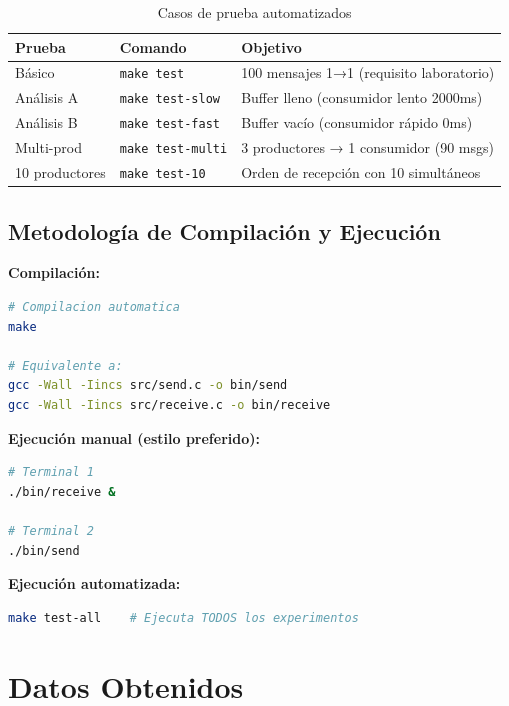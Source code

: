 \documentclass[10pt]{article}
\begin{document}
\begin{table}[h]
\centering
\begin{tabular}{|l|l|p{6cm}|}
\hline
\textbf{Prueba} & \textbf{Comando} & \textbf{Objetivo} \\
\hline
Básico & \texttt{make test} & 100 mensajes 1→1 (requisito laboratorio) \\
\hline
Análisis A & \texttt{make test-slow} & Buffer lleno (consumidor lento 2000ms) \\
\hline
Análisis B & \texttt{make test-fast} & Buffer vacío (consumidor rápido 0ms) \\
\hline
Multi-prod & \texttt{make test-multi} & 3 productores → 1 consumidor (90 msgs) \\
\hline
10 productores & \texttt{make test-10} & Orden de recepción con 10 simultáneos \\
\hline
\end{tabular}
\caption{Casos de prueba automatizados}
\end{table}

\subsection{Metodología de Compilación y Ejecución}

\textbf{Compilación:}
\begin{lstlisting}[language=bash]
# Compilacion automatica
make

# Equivalente a:
gcc -Wall -Iincs src/send.c -o bin/send
gcc -Wall -Iincs src/receive.c -o bin/receive
\end{lstlisting}

\textbf{Ejecución manual (estilo preferido):}
\begin{lstlisting}[language=bash]
# Terminal 1
./bin/receive &

# Terminal 2
./bin/send
\end{lstlisting}

\textbf{Ejecución automatizada:}
\begin{lstlisting}[language=bash]
make test-all    # Ejecuta TODOS los experimentos
\end{lstlisting}

\clearpage

\section{Datos Obtenidos}
\end{document}

